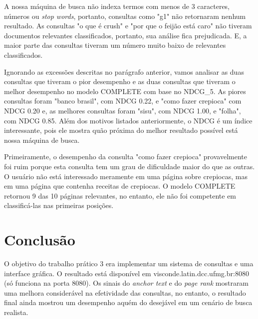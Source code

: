 \documentclass{article}
\begin{document}
A nossa máquina de busca não indexa termos com menos de 3 caracteres, números ou \textit{stop words}, portanto, consultas
como "g1" não retornaram nenhum resultado. As consultas "o que é crush" e "por que o feijão está caro" não tiveram documentos
relevantes classificados, portanto, sua análise fica prejudicada. E, a maior parte das consultas tiveram um número muito baixo
de relevantes classificados.

Ignorando as excessões descritas no parágrafo anterior, vamos analisar as duas consultas que tiveram o pior desempenho e as
duas consultas que tiveram o melhor desempenho no modelo COMPLETE com base no NDCG\_5. As piores consultas foram "banco brasil",
com NDCG 0.22, e "como fazer crepioca" com NDCG 0.20 e, as melhores consultas foram "sisu", com NDCG 1.00, e "folha", com
NDCG 0.85. Além dos motivos listados anteriormente, o NDCG é um índice interessante, pois ele mostra quão próxima do melhor resultado
possível está nossa máquina de busca.

Primeiramente, o desempenho da consulta "como fazer crepioca" provavelmente foi ruim porque esta consulta tem um grau de dificuldade
maior do que as outras. O usuário não está interessado meramente em uma página sobre crepiocas, mas em uma página que contenha receitas
de crepiocas. O modelo COMPLETE retornou 9 das 10 páginas relevantes, no entanto, ele não foi competente em classificá-las nas primeiras
posições.


\section{Conclusão}

O objetivo do trabalho prático 3 era implementar um sistema de consultas e uma interface gráfica. O resultado
está disponível em visconde.latin.dcc.ufmg.br:8080 (só funciona na porta 8080). Os sinais do
\textit{anchor text} e do \textit{page rank} mostraram uma melhora considerável na efetividade
das consultas, no entanto, o resultado final ainda mostrou um desempenho aquém do desejável em
um cenário de busca realista.
\end{document}
